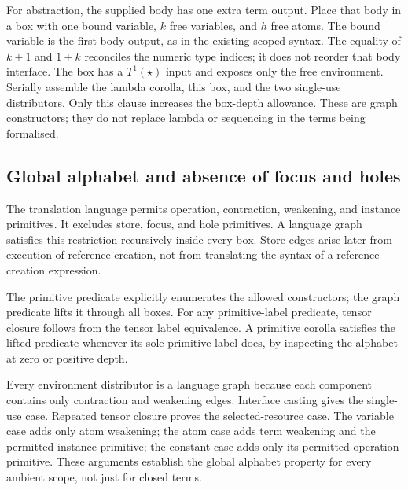 For abstraction, the supplied body has one extra term output. Place that
body in a box with one bound variable, $k$ free variables, and $h$ free atoms.
The bound variable is the first body output, as in the existing scoped
syntax. The equality of $k+1$ and $1+k$ reconciles the numeric type indices;
it does not reorder that body interface. The box has a $T^1(\star)$ input
and exposes only the free environment. Serially assemble the lambda corolla,
this box, and the two single-use distributors. Only this clause increases
the box-depth allowance. These are graph constructors; they do not replace
lambda or sequencing in the terms being formalised.




\subsection{Global alphabet and absence of focus and holes}
The translation language permits operation, contraction, weakening, and
instance primitives. It excludes store, focus, and hole primitives.
A language graph satisfies this restriction recursively inside every box.
Store edges arise later from execution of reference creation, not from
translating the syntax of a reference-creation expression.

The primitive predicate explicitly enumerates the allowed constructors;
the graph predicate lifts it through all boxes. For any primitive-label
predicate, tensor closure follows from the tensor label equivalence. A
primitive corolla satisfies the lifted predicate whenever its sole primitive
label does, by inspecting the alphabet at zero or positive depth.





Every environment distributor is a language graph because each component
contains only contraction and weakening edges. Interface casting gives the
single-use case. Repeated tensor closure proves the selected-resource case.
The variable case adds only atom weakening; the atom case adds term weakening
and the permitted instance primitive; the constant case adds only its
permitted operation primitive. These arguments establish the global alphabet
property for every ambient scope, not just for closed terms.


